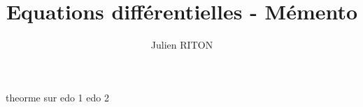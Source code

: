 \documentclass[10pt,a4paper]{article}
\author{Julien RITON}
\title{Equations différentielles - Mémento}
\begin{document}
theorme sur edo 1
edo 2
\end{document}

